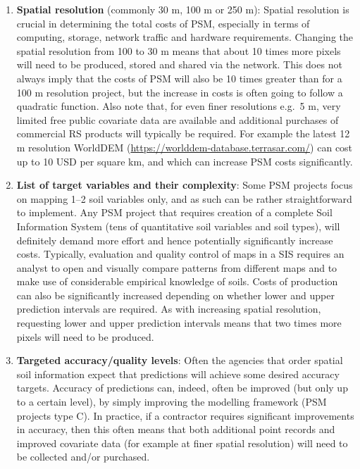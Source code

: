\documentclass[graybox,natbib,nospthms,UStrade]{svmono}
\begin{document}
\begin{enumerate}
\def\labelenumi{\arabic{enumi}.}
\item
  \textbf{Spatial resolution} (commonly 30 m, 100 m or 250 m): Spatial
  resolution is crucial in determining the total costs of PSM,
  especially in terms of computing, storage, network traffic and
  hardware requirements. Changing the spatial resolution from 100 to
  30 m means that about 10 times more pixels will need to be
  produced, stored and shared via the network. This does not always
  imply that the costs of PSM will also be 10 times greater than for
  a 100 m resolution project, but the increase in costs is often
  going to follow a quadratic function. Also note that, for even
  finer resolutions e.g.~5 m, very limited free public covariate
  data are available and additional purchases of commercial RS
  products will typically be required. For example the latest 12 m
  resolution WorldDEM (\url{https://worlddem-database.terrasar.com/}) can cost
  up to 10 USD per square km, and which can increase PSM costs significantly.
\item
  \textbf{List of target variables and their complexity}: Some PSM projects
  focus on mapping 1--2 soil variables only, and as such can be
  rather straightforward to implement. Any PSM project that requires
  creation of a complete Soil Information System (tens of
  quantitative soil variables and soil types), will definitely
  demand more effort and hence potentially significantly
  increase costs. Typically, evaluation and quality control of maps
  in a SIS requires an analyst to open and visually compare patterns
  from different maps and to make use of considerable empirical
  knowledge of soils. Costs of production can also be significantly
  increased depending on whether lower and upper prediction
  intervals are required. As with increasing spatial resolution,
  requesting lower and upper prediction intervals means that two
  times more pixels will need to be produced.
\item
  \textbf{Targeted accuracy/quality levels}: Often the agencies that order
  spatial soil information expect that predictions will achieve some
  desired accuracy targets. Accuracy of predictions can, indeed,
  often be improved (but only up to a certain level), by simply
  improving the modelling framework (PSM projects type C). In
  practice, if a contractor requires significant improvements in
  accuracy, then this often means that both additional point records
  and improved covariate data (for example at finer
  spatial resolution) will need to be collected and/or purchased.

\end{enumerate}
\end{document}
